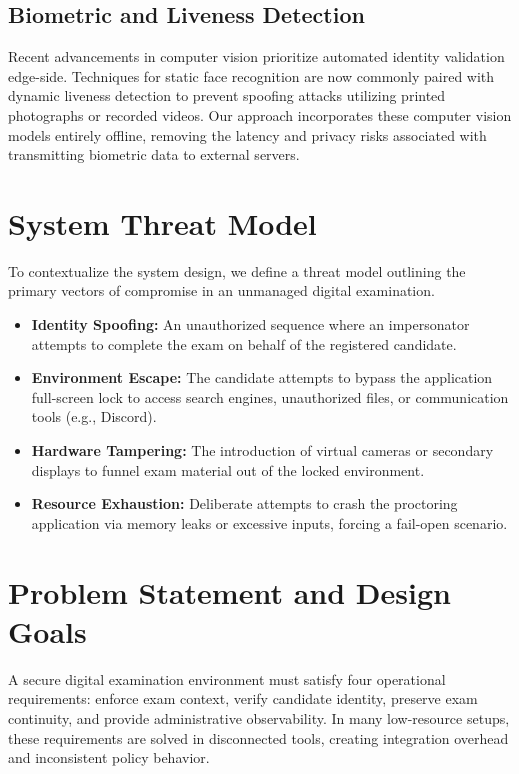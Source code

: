 \documentclass[conference]{IEEEtran}
\begin{document}
\subsection{Biometric and Liveness Detection}
Recent advancements in computer vision prioritize automated identity validation edge-side. Techniques for static face recognition \cite{cognitive} are now commonly paired with dynamic liveness detection \cite{liveness, wang_2023_continuous, gupta_2024_edge} to prevent spoofing attacks utilizing printed photographs or recorded videos. Our approach incorporates these computer vision models entirely offline, removing the latency and privacy risks associated with transmitting biometric data to external servers.

\section{System Threat Model}
To contextualize the system design, we define a threat model outlining the primary vectors of compromise in an unmanaged digital examination.
\begin{itemize}
\item \textbf{Identity Spoofing:} An unauthorized sequence where an impersonator attempts to complete the exam on behalf of the registered candidate.
\item \textbf{Environment Escape:} The candidate attempts to bypass the application full-screen lock to access search engines, unauthorized files, or communication tools (e.g., Discord).
\item \textbf{Hardware Tampering:} The introduction of virtual cameras or secondary displays to funnel exam material out of the locked environment.
\item \textbf{Resource Exhaustion:} Deliberate attempts to crash the proctoring application via memory leaks or excessive inputs, forcing a fail-open scenario.
\end{itemize}

\section{Problem Statement and Design Goals}
A secure digital examination environment must satisfy four operational requirements: enforce exam context, verify candidate identity, preserve exam continuity, and provide administrative observability. In many low-resource setups, these requirements are solved in disconnected tools, creating integration overhead and inconsistent policy behavior.
\end{document}
